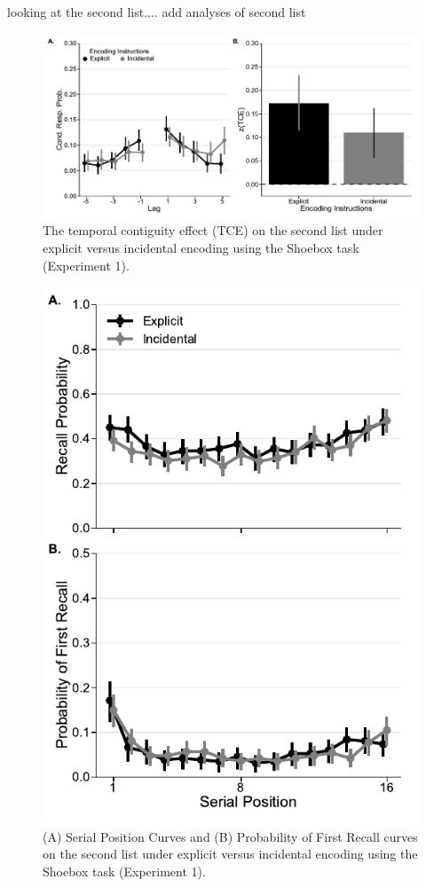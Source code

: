 \documentclass[jou,natbib,floatsintext]{apa6} %
\begin{document}
\label{TODO-6} looking at the second list.... add analyses of second list

\begin{figure}
\includegraphics{figures/E1_crp_list2.pdf}
\caption{The temporal contiguity effect (TCE) on the second list under explicit versus incidental encoding using the Shoebox task (Experiment 1). \paneltext}
\label{e1_l2_crp}
\end{figure}


\begin{figure}
\includegraphics{figures/E1_spc_list2.pdf}
\caption{(A) Serial Position Curves and (B) Probability of First Recall curves on the second list under explicit versus incidental encoding using the Shoebox task (Experiment 1). \spcpaneltext}
\label{e1_l2_spc}
\end{figure}
\end{document}
